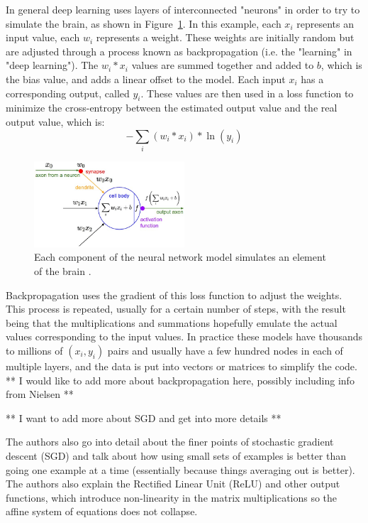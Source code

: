 \documentclass[]{report}
\begin{document}
In general deep learning uses layers of interconnected "neurons" in order to try to simulate the brain, as shown in Figure~\ref{neural-model}. In this example, each $x_{i}$ represents an input value, each $w_{i}$ represents a weight. These weights are initially random but are adjusted through a process known as backpropagation (i.e. the "learning" in "deep learning"). The $w_{i}*x_{i}$ values are summed together and added to $b$, which is the bias value, and adds a linear offset to the model. Each input $x_{i}$ has a corresponding output, called $y_{i}$. These values are then used in a loss function to minimize the cross-entropy between the estimated output value and the real output value, which is: $$-\sum_{i} (w_{i}*x_{i})*\ln(y_{i}) $$
\begin{figure}
	\centering
	\includegraphics[width=0.5\textwidth]{../images/neuron_model}
	\caption{Each component of the neural network model simulates an element of the brain \cite{karpathy}.}
	\label{neural-model}
\end{figure}

Backpropagation uses the gradient of this loss function to adjust the weights. This process is repeated, usually for a certain number of steps, with the result being that the multiplications and summations hopefully emulate the actual values corresponding to the input values. In practice these models have thousands to millions of $(x_{i}, y_{i})$ pairs and usually have a few hundred nodes in each of multiple layers, and the data is put into vectors or matrices to simplify the code. ** I would like to add more about backpropagation here, possibly including info from Nielsen **


** I want to add more about SGD and get into more details **

The authors also go into detail about the finer points of stochastic gradient descent (SGD) and talk about how using small sets of examples is better than going one example at a time (essentially because things averaging out is better). The authors also explain the Rectified Linear Unit (ReLU) and other output functions, which introduce non-linearity in the matrix multiplications so the affine system of equations does not collapse.
\end{document}
